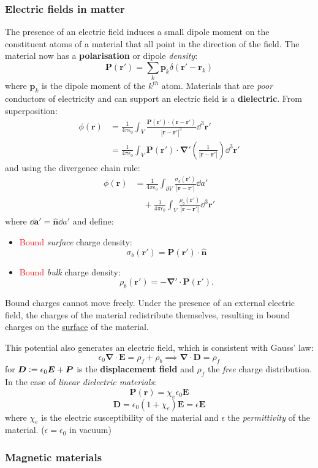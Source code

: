 \documentclass{article}
\newcommand{\deq}{\vcentcolon=}
\newcommand{\vc}[1]{\boldsymbol{#1}}
\begin{document}
\begin{multicols*}{3}
\newcolumn

\subsubsection*{Electric fields in matter}
The presence of an electric field induces a small dipole moment
on the constituent atoms of a material that all point in the direction
of the field. The material now has a \textbf{polarisation}
or dipole \textit{density}:
$$\vc{P}(\vc{r}')=\sum_{k}\vc{p}_k\delta(\vc{r}'-\vc{r}_k)$$
where $\vc{p}_k$ is the dipole moment of the $k^{th}$ atom. Materials
that are \textit{poor} conductors of electricity and can support an
electric field is a \textbf{dielectric}. From superposition:
\begin{align*}
    \phi(\vc{r})
    &=\frac{1}{4\pi\epsilon_0}\int_V
    \frac{\vc{P}(\vc{r}')\cdot(\vc{r}-\vc{r}')}
    {|\vc{r}-\vc{r}'|^3}\dd^3\vc{r}' \\
    &=\frac{1}{4\pi\epsilon_0}\int_V\vc{P}(\vc{r}')
    \cdot\vc{\nabla'}\left(\frac{1}{|\vc{r}-\vc{r}'|}\right)
    \dd^3\vc{r}'
\end{align*}
and using the divergence chain rule:
\begin{align*}
    \phi(\vc{r})
    &=\frac{1}{4\pi\epsilon_0}\int_{\partial V}
    \frac{\sigma_b(\vc{r}')}{|\vc{r}-\vc{r}'|}\dd a' \\
    &\quad+\frac{1}{4\pi\epsilon_0}\int_V
    \frac{\rho_b(\vc{r}')}{|\vc{r}-\vc{r}'|}\dd^3\vc{r}'
\end{align*}
where $\dd\vc{a}'=\hat{\vc{n}}\dd a'$ and define:
\begin{itemize}
    \item \textcolor{red}{Bound} \textit{surface} charge density:
    $$\sigma_b(\vc{r}')=\vc{P}(\vc{r}')\cdot\hat{\vc{n}}$$

    \item \textcolor{red}{Bound} \textit{bulk} charge density:
    $$\rho_b(\vc{r}')=-\vc{\nabla}'\cdot\vc{P}(\vc{r}').$$
\end{itemize}
Bound charges cannot move freely. Under the presence of an external
electric field, the charges of the material redistribute themselves,
resulting in bound charges on the \underline{surface} of the material.

This potential also generates an electric field,
which is consistent with Gauss' law:
$$\epsilon_0\vc{\nabla}\cdot\vc{E}=\rho_f+\rho_b
\implies\vc{\nabla}\cdot\vc{D}=\rho_f$$
for $\vc{D}\deq\epsilon_0\vc{E}+\vc{P}$ is the \textbf{displacement field}
and $\rho_f$ the \textit{free} charge distribution.
In the case of \textit{linear dielectric materials}:
$$\vc{P}(\vc{r})=\chi_e\epsilon_0\vc{E}$$
$$\vc{D}=\epsilon_0(1+\chi_e)\vc{E}=\epsilon\vc{E}$$
where $\chi_e$ is the electric susceptibility of the material
and $\epsilon$ the \textit{permittivity} of the material.
($\epsilon=\epsilon_0$ in vacuum)

\subsubsection*{Magnetic materials}

\end{multicols*}
\end{document}
